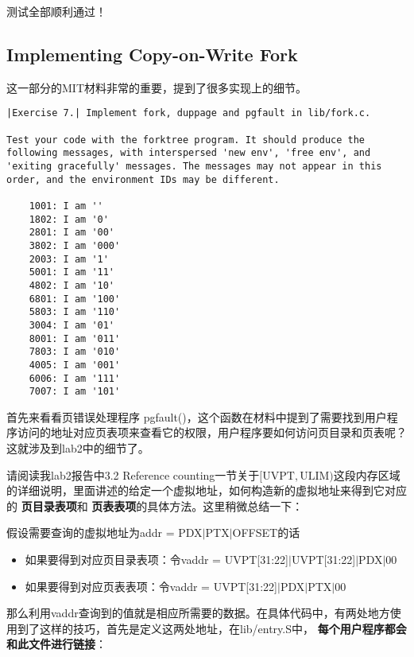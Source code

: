 \documentclass{article}
\newcommand{\highlight}[1]{{\bfseries \color{red}  #1}}
\newcommand{\funcname}[1]{{\ttfamily \small #1}}
\begin{document}
\begin{CJK*}{UTF8}{gkai}
测试全部顺利通过！

\subsection{Implementing Copy-on-Write Fork}

这一部分的MIT材料非常的重要，提到了很多实现上的细节。

\newpage

\begin{lstlisting}[style=exercise]
|Exercise 7.| Implement fork, duppage and pgfault in lib/fork.c.

Test your code with the forktree program. It should produce the following messages, with interspersed 'new env', 'free env', and 'exiting gracefully' messages. The messages may not appear in this order, and the environment IDs may be different.

	1001: I am ''
	1802: I am '0'
	2801: I am '00'
	3802: I am '000'
	2003: I am '1'
	5001: I am '11'
	4802: I am '10'
	6801: I am '100'
	5803: I am '110'
	3004: I am '01'
	8001: I am '011'
	7803: I am '010'
	4005: I am '001'
	6006: I am '111'
	7007: I am '101'
\end{lstlisting}

\vspace{4em}

首先来看看页错误处理程序 \funcname{pgfault()}，这个函数在材料中提到了需要找到用户程序访问的地址对应页表项来查看它的权限，用户程序要如何访问页目录和页表呢？这就涉及到lab2中的细节了。

请阅读我lab2报告中3.2 Reference counting一节关于$[\mathrm{UVPT}, \mathrm{ULIM})$这段内存区域的详细说明，里面讲述的给定一个虚拟地址，如何构造新的虚拟地址来得到它对应的\highlight{页目录表项}和\highlight{页表表项}的具体方法。这里稍微总结一下：

假设需要查询的虚拟地址为addr = PDX$\left|\right.$PTX$\left|\right.$OFFSET的话
\begin{itemize}
\item{如果要得到对应页目录表项：令vaddr = UVPT[31:22]$\left|\right.$UVPT[31:22]$\left|\right.$PDX$\left|\right.$00}
\item{如果要得到对应页表表项：令vaddr = UVPT[31:22]$\left|\right.$PDX$\left|\right.$PTX$\left|\right.$00}
\end{itemize}

那么利用vaddr查询到的值就是相应所需要的数据。在具体代码中，有两处地方使用到了这样的技巧，首先是定义这两处地址，在lib/entry.S中，\highlight{每个用户程序都会和此文件进行链接}：


\end{CJK*}
\end{document}
